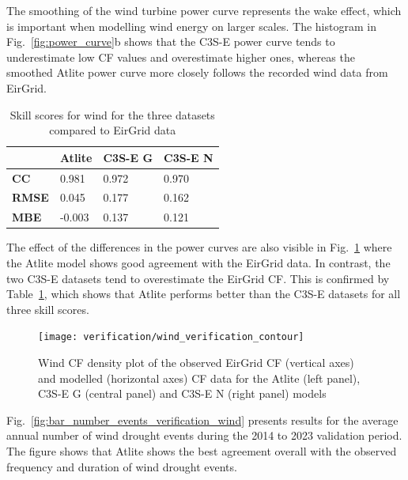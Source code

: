 \documentclass[a4paper, 11pt]{article}
\begin{document}
The smoothing of the wind turbine power curve represents the wake effect, which is important when modelling wind energy on larger scales. The histogram in Fig.~\ref{fig:power_curve}b shows that the C3S-E power curve tends to underestimate low CF values and overestimate higher ones, whereas the smoothed Atlite power curve more closely follows the recorded wind data from EirGrid.

\begin{table}[!ht]
	\centering
	\begin{tabular}{l|lll|}
		\cline{2-4}
		& \textbf{Atlite} & \textbf{C3S-E G} & \textbf{C3S-E N} \\ \hline
		\multicolumn{1}{|l|}{\textbf{CC}}   & 0.981           & 0.972            & 0.970            \\ \hline
		\multicolumn{1}{|l|}{\textbf{RMSE}} & 0.045           & 0.177            & 0.162            \\ \hline
		\multicolumn{1}{|l|}{\textbf{MBE}}   & -0.003          & 0.137            & 0.121            \\ \hline
	\end{tabular}
	\caption{Skill scores for wind for the three datasets compared to EirGrid data}
	\label{tab:wind_skill_scores}
\end{table}

The effect of the differences in the power curves are also visible in Fig.~\ref{fig:wind_verification_contour} where the Atlite model shows good agreement with the EirGrid data. In contrast, the two C3S-E datasets tend to overestimate the EirGrid CF. This is confirmed by Table~\ref{tab:wind_skill_scores}, which shows that Atlite performs better than the C3S-E datasets for all three skill scores.

\begin{figure}[!ht]
	\centering
	\texttt{[image: verification/wind\_verification\_contour]}
	\caption{Wind CF density plot of the observed EirGrid CF (vertical axes) and modelled (horizontal axes) CF data for the Atlite  (left panel), C3S-E G (central panel) and C3S-E N (right panel) models}
	\label{fig:wind_verification_contour}
\end{figure}

Fig.~\ref{fig:bar_number_events_verification_wind} presents results for the average annual number of wind drought events during the 2014 to 2023 validation period. The figure shows that Atlite shows the best agreement overall with the observed frequency and duration of wind drought events.
\end{document}
